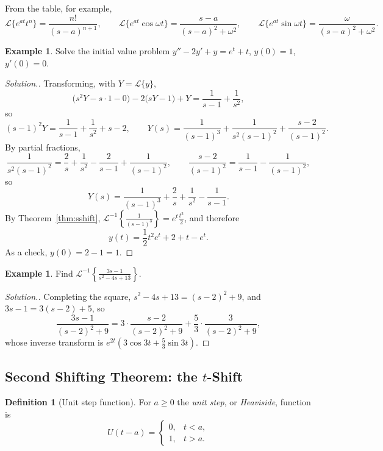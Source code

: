 \documentclass[11pt,a4paper]{article}
\theoremstyle{definition}
\newtheorem{defn}[thm]{Definition}
\newtheorem{exa}[thm]{Example}
\newenvironment{solution}
  {\renewcommand{\qedsymbol}{}\begin{proof}[\textit{Solution}.]}
  {\end{proof}}
\begin{document}
From the table, for example,
\[\mathcal{L}\{e^{at}t^n\} = \frac{n!}{(s-a)^{n+1}} ,\qquad \mathcal{L}\{e^{at}
\cos \omega t\}=\frac{s - a}{(s-a)^2 + \omega^2} ,\qquad \mathcal{L}\{e^{at}\sin
\omega t\}=\frac{\omega}{(s-a)^2 + \omega^2} .\]

\begin{exa}
\label{ex:sshiftivp}
Solve the initial value problem $y'' - 2y' + y = e^t + t$, $y(0) = 1$,
$y'(0) = 0$.
\end{exa}

\begin{solution}
Transforming, with $Y = \mathcal{L}\{y\}$,
\[\big(s^2Y - s\cdot 1 - 0\big) - 2\big(sY - 1\big) + Y = \frac{1}{s -1} +
\frac{1}{s^2},\]
so
\[(s - 1)^2Y = \frac{1}{s - 1} + \frac{1}{s^2} + s - 2 ,\qquad Y(s) =
\frac{1}{(s -1)^3} + \frac{1}{s^2 (s-1)^2} + \frac{s-2}{(s-1)^2} .\]
By partial fractions,
\[\frac{1}{s^2(s-1)^2} = \frac{2}{s} + \frac{1}{s^2} - \frac{2}{s - 1} +
\frac{1}{(s-1)^2},\qquad \frac{s - 2}{(s-1)^2} = \frac{1}{s - 1} -
\frac{1}{(s-1)^2},\]
so
\[Y(s) = \frac{1}{(s - 1)^3} + \frac{2}{s} + \frac{1}{s^2} - \frac{1}{s-1} .\]
By Theorem~\ref{thm:sshift}, $\mathcal{L}^{-1}\left\{\frac{1}{(s-1)^3}\right\} =
e^t\frac{t^2}{2}$, and therefore
\[y(t) = \frac{1}{2}t^2e^t + 2 + t - e^t .\]
As a check, $y(0) = 2 - 1 = 1$.
\end{solution}

\begin{exa}
\label{ex:sshiftinverse}
Find $\mathcal{L}^{-1}\left\{\frac{3s - 1}{s^2 - 4s + 13}\right\}$.
\end{exa}

\begin{solution}
Completing the square, $s^2 - 4s + 13 = (s - 2)^2 + 9$, and
$3s - 1 = 3(s - 2) + 5$, so
\[\frac{3s - 1}{(s-2)^2 + 9} = 3\cdot\frac{s - 2}{(s-2)^2 + 9} +
\frac53\cdot\frac{3}{(s-2)^2 + 9},\]
whose inverse transform is $e^{2t}\left(3\cos 3t + \frac53\sin 3t\right)$.
\end{solution}

{\color[wave]{485}\subsection{Second Shifting Theorem: the $t$-Shift}}

\begin{defn}[Unit step function]
\label{defn:heaviside}
For $a\geq 0$ the \emph{unit step}, or \emph{Heaviside}, function is
\[ U(t-a) =
\begin{cases}
0, & t<a,\\
1, & t>a .
\end{cases}
\]
\end{defn}
\end{document}
